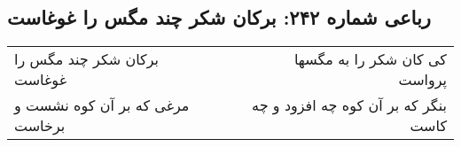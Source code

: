 \begin{center}
\section*{رباعی شماره ۲۴۲: برکان شکر چند مگس را غوغاست}
\label{sec:0242}
\begin{longtable}{l p{0.5cm} r}
برکان شکر چند مگس را غوغاست
&&
کی کان شکر را به مگسها پرواست
\\
مرغی که بر آن کوه نشست و برخاست
&&
بنگر که بر آن کوه چه افزود و چه کاست
\\
\end{longtable}
\end{center}
